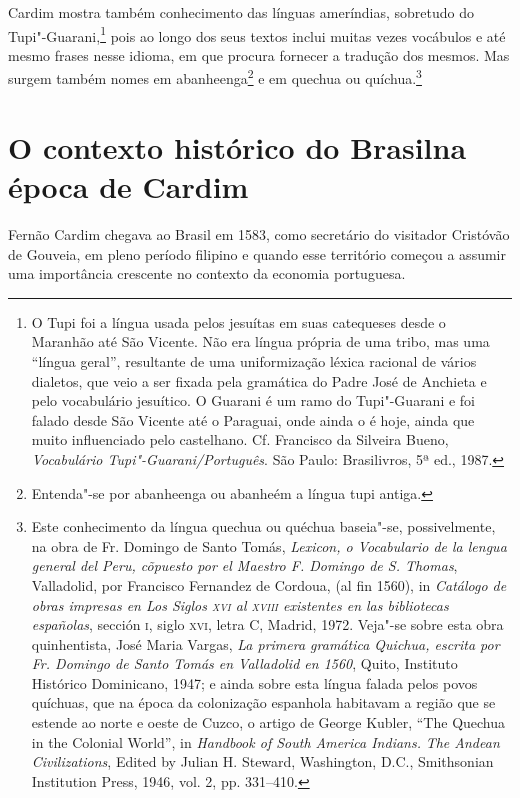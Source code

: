 Cardim mostra também conhecimento das línguas ameríndias, sobretudo
do Tupi"-Guarani,\footnote{ O Tupi foi a língua usada pelos
jesuítas em suas catequeses desde o Maranhão até São Vicente. Não era
língua própria de uma tribo, mas uma ``língua geral'', resultante de uma
uniformização léxica racional de vários dialetos, que veio a ser
fixada pela gramática do Padre José de Anchieta e pelo vocabulário
jesuítico. O Guarani é um ramo do Tupi"-Guarani e foi falado
desde São Vicente até o Paraguai, onde ainda o é hoje, ainda que muito
influenciado pelo castelhano. Cf. Francisco da Silveira Bueno,
\textit{Vocabulário Tupi"-Guarani/Português}. São Paulo: Brasilivros, 
5ª ed., 1987.} pois ao longo dos seus textos inclui muitas 
vezes vocábulos e até mesmo frases nesse idioma, em que procura
fornecer a tradução dos mesmos. Mas surgem também nomes em
abanheenga\footnote{ Entenda"-se por abanheenga ou
abanheém a língua tupi antiga.} e em quechua ou 
quíchua.\footnote{ Este conhecimento da língua quechua ou
quéchua baseia"-se, possivelmente, na obra de Fr. Domingo de Santo
Tomás, \textit{Lexicon, o Vocabulario de la lengua general del Peru,
cõpuesto por el Maestro F. Domingo de S. Thomas}, Valladolid, por
Francisco Fernandez de Cordoua, (al fin 1560), in \textit{Catálogo de
obras impresas en Los Siglos \textsc{xvi} al \textsc{xviii} existentes en las
bibliotecas españolas}, sección \textsc{i}, siglo \textsc{xvi}, letra C, Madrid, 1972.
Veja"-se sobre esta obra quinhentista, José Maria Vargas, \textit{La
primera gramática Quichua, escrita por Fr. Domingo de Santo Tomás en
Valladolid en 1560}, Quito, Instituto Histórico Dominicano, 1947; e
ainda sobre esta língua falada pelos povos quíchuas, que na época 
da colonização espanhola habitavam a região que se estende ao
norte e oeste de Cuzco, o artigo de George Kubler, ``The Quechua in the
Colonial World'', in \textit{Handbook of South America Indians.}
\textit{The Andean Civilizations}, Edited by Julian H. Steward,
Washington, D.C., Smithsonian Institution Press, 1946, vol. 2, pp. 331--410.}

\section*{O contexto histórico do Brasil\break na época de Cardim} 

Fernão Cardim chegava ao Brasil em 1583, como secretário do visitador
Cristóvão de Gouveia, em pleno período filipino e quando esse território 
começou a assumir uma importância crescente no contexto da economia portuguesa. 

